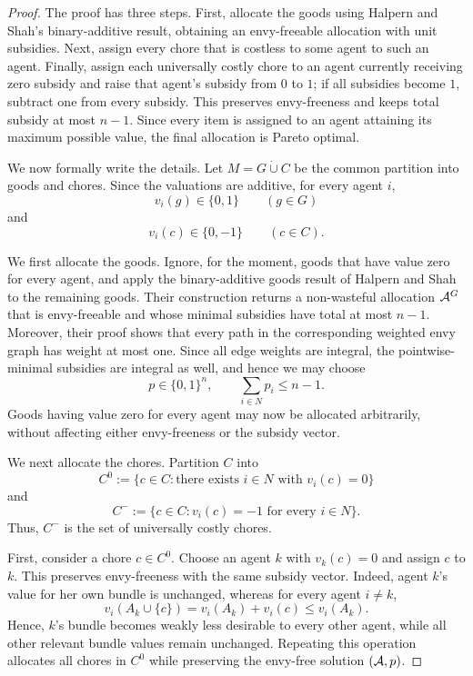\begin{proof}
The proof has three steps. First, allocate the goods using Halpern and Shah's binary-additive result, obtaining an envy-freeable allocation with unit subsidies. Next, assign every chore that is costless to some agent to such an agent. Finally, assign each universally costly chore to an agent currently receiving zero subsidy and raise that agent's subsidy from $0$ to $1$; if all subsidies become $1$, subtract one from every subsidy. This preserves envy-freeness and keeps total subsidy at most $n-1$. Since every item is assigned to an agent attaining its maximum possible value, the final allocation is Pareto optimal.


We now formally write the details. Let $M=G\mathbin{\dot\cup}C$ be the common partition into goods and chores. Since the valuations are additive, for every agent $i$,
\[
v_i(g)\in\{0,1\}\qquad (g\in G)
\]
and
\[
v_i(c)\in\{0,-1\}\qquad (c\in C).
\]

We first allocate the goods. Ignore, for the moment, goods that have value zero for every agent, and apply the binary-additive goods result of Halpern and Shah~\cite{HS19} to the remaining goods. Their construction returns a non-wasteful allocation $\mathcal{A}^G$ that is envy-freeable and whose minimal subsidies have total at most $n-1$. Moreover, their proof shows that every path in the corresponding weighted envy graph has weight at most one. Since all edge weights are integral, the pointwise-minimal subsidies are integral as well, and hence we may choose
\[
p\in\{0,1\}^n,
\qquad
\sum_{i\in N}p_i\leq n-1.
\]
Goods having value zero for every agent may now be allocated arbitrarily, without affecting either envy-freeness or the subsidy vector.

We next allocate the chores. Partition $C$ into
\[
C^0:=\{c\in C:\text{there exists }i\in N\text{ with }v_i(c)=0\}
\]
and
\[
C^-:=\{c\in C:v_i(c)=-1\text{ for every }i\in N\}.
\]
Thus, $C^-$ is the set of universally costly chores.

First, consider a chore $c\in C^0$. Choose an agent $k$ with $v_k(c)=0$ and assign $c$ to $k$. This preserves envy-freeness with the same subsidy vector. Indeed, agent $k$'s value for her own bundle is unchanged, whereas for every agent $i\neq k$,
\[
v_i(A_k\cup\{c\})
=
v_i(A_k)+v_i(c)
\leq v_i(A_k).
\]
Hence, $k$'s bundle becomes weakly less desirable to every other agent, while all other relevant bundle values remain unchanged. Repeating this operation allocates all chores in $C^0$ while preserving the envy-free solution $(\mathcal{A},p)$.


\end{proof}
